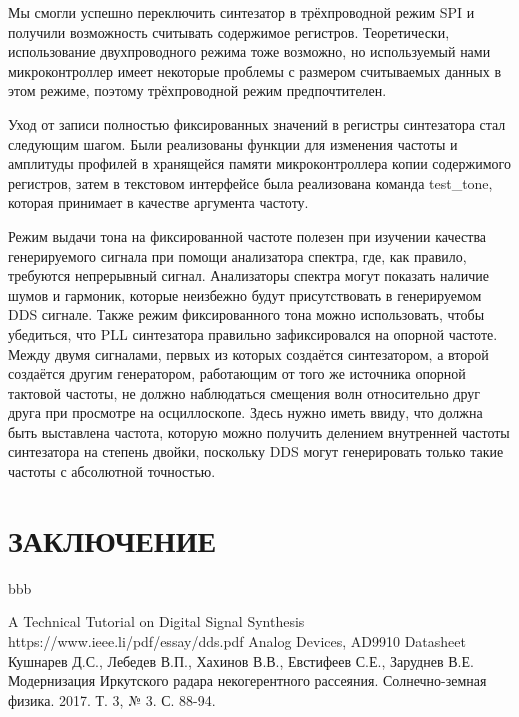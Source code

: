 \documentclass[rusmathsym, eqnumwithinsec, amspack, hyperref]{bomgost}
\begin{document}
Мы смогли успешно переключить синтезатор в трёхпроводной режим SPI и получили возможность считывать содержимое регистров. Теоретически, использование двухпроводного режима тоже возможно, но используемый нами микроконтроллер имеет некоторые проблемы с размером считываемых данных в этом режиме, поэтому трёхпроводной режим предпочтителен.

Уход от записи полностью фиксированных значений в регистры синтезатора стал следующим шагом. Были реализованы функции для изменения частоты и амплитуды профилей в хранящейся памяти микроконтроллера копии содержимого регистров, затем в текстовом интерфейсе была реализована команда test\_tone, которая принимает в качестве аргумента частоту.

Режим выдачи тона на фиксированной частоте полезен при изучении качества генерируемого сигнала при помощи анализатора спектра, где, как правило, требуются непрерывный сигнал. Анализаторы спектра могут показать наличие шумов и гармоник, которые неизбежно будут присутствовать в генерируемом DDS сигнале. Также режим фиксированного тона можно использовать, чтобы убедиться, что PLL синтезатора правильно зафиксировался на опорной частоте. Между двумя сигналами, первых из которых создаётся синтезатором, а второй создаётся другим генератором, работающим от того же источника опорной тактовой частоты, не должно наблюдаться смещения волн относительно друг друга при просмотре на осциллоскопе. Здесь нужно иметь ввиду, что должна быть выставлена частота, которую можно получить делением внутренней частоты синтезатора на степень двойки, поскольку DDS могут генерировать только такие частоты с абсолютной точностью.

\section*{ЗАКЛЮЧЕНИЕ}
bbb

\begin{thebibliography}{11}
 A Technical Tutorial
on Digital Signal Synthesis https://www.ieee.li/pdf/essay/dds.pdf
 Analog Devices, AD9910 Datasheet
 Кушнарев Д.С., Лебедев В.П., Хахинов В.В., Евстифеев С.Е., Заруднев В.Е. Модернизация Иркутского радара некогерентного рассеяния. Солнечно-земная физика. 2017. Т. 3, № 3. С. 88-94.
\end{thebibliography}
\end{document}
